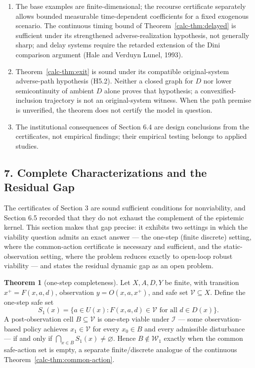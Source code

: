 \documentclass[10pt,twocolumn]{article}
\theoremstyle{definition}
\newtheorem{theorem}{Theorem}
\begin{document}
\begin{enumerate}
\item
  The base examples are finite-dimensional; the recourse certificate separately allows bounded measurable time-dependent coefficients for a fixed exogenous scenario. The continuous timing bound of Theorem~\ref{calc-thm:delayed} is sufficient under its strengthened adverse-realization hypothesis, not generally sharp; and delay systems require the retarded extension of the Dini comparison argument (Hale and Verduyn Lunel, 1993).
\item
  Theorem~\ref{calc-thm:exit} is sound under its compatible original-system adverse-path hypothesis (H5.2). Neither a closed graph for \(D\) nor lower semicontinuity of ambient \(D\) alone proves that hypothesis; a convexified-inclusion trajectory is not an original-system witness. When the path premise is unverified, the theorem does not certify the model in question.
\item
  The institutional consequences of Section 6.4 are design conclusions from the certificates, not empirical findings; their empirical testing belongs to applied studies.
\end{enumerate}




\subsection{7. Complete Characterizations and the Residual Gap}\label{calc-complete-characterizations}

The certificates of Section 3 are sound sufficient conditions for nonviability, and Section 6.5 recorded that they do not exhaust the complement of the epistemic kernel. This section makes that gap precise: it exhibits two settings in which the viability question admits an exact answer --- the one-step (finite discrete) setting, where the common-action certificate is necessary and sufficient, and the static-observation setting, where the problem reduces exactly to open-loop robust viability --- and states the residual dynamic gap as an open problem.

\begin{theorem}[one-step completeness]\label{calc-thm:onestep}
Let \(X, A, D, Y\) be finite, with transition \(x^{+} = F(x,a,d)\), observation \(y = O(x,a,x^{+})\), and safe set \(\mathcal{V} \subseteq X\). Define the one-step safe set
\[
S_{1}(x) = \bigl\{ a \in U(x) : F(x,a,d) \in \mathcal{V} \text{ for all } d \in D(x) \bigr\}.
\]
A post-observation cell \(B \subseteq \mathcal{V}\) is one-step viable under \(\mathcal{I}\) --- some observation-based policy achieves \(x_{1} \in \mathcal{V}\) for every \(x_{0} \in B\) and every admissible disturbance --- if and only if \(\bigcap_{x \in B} S_{1}(x) \neq \varnothing\). Hence \(B \notin \mathcal{W}_{1}\) exactly when the common safe-action set is empty, a separate finite/discrete analogue of the continuous Theorem~\ref{calc-thm:common-action}.
\end{theorem}
\end{document}
